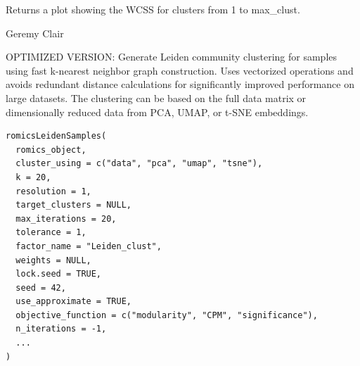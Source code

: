 \documentclass[a4paper]{book}
\begin{document}
%
\begin{Value}
Returns a plot showing the WCSS for clusters from 1 to max\_clust.
\end{Value}
%
\begin{Author}
Geremy Clair
\end{Author}
%
\begin{Description}
OPTIMIZED VERSION: Generate Leiden community clustering for samples using fast k-nearest neighbor graph construction.
Uses vectorized operations and avoids redundant distance calculations for significantly improved performance on large datasets.
The clustering can be based on the full data matrix or dimensionally reduced data from PCA, UMAP, or t-SNE embeddings.
\end{Description}
%
\begin{Usage}
\begin{verbatim}
romicsLeidenSamples(
  romics_object,
  cluster_using = c("data", "pca", "umap", "tsne"),
  k = 20,
  resolution = 1,
  target_clusters = NULL,
  max_iterations = 20,
  tolerance = 1,
  factor_name = "Leiden_clust",
  weights = NULL,
  lock.seed = TRUE,
  seed = 42,
  use_approximate = TRUE,
  objective_function = c("modularity", "CPM", "significance"),
  n_iterations = -1,
  ...
)
\end{verbatim}
\end{Usage}
%
\end{document}

